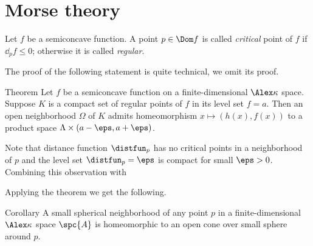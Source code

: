 \section{Morse theory}

Let $f$ be a semiconcave function.
A point $p\in \Dom f$ is called \emph{critical} point of $f$ if $\dd_pf\le 0$; 
otherwise it is called \emph{regular}.

The proof of the following statement is quite technical, we omit its proof.

\begin{thm}{Theorem}
Let $f$ be a semiconcave function on a finite-dimensional $\Alex\kappa$ space.
Suppose $K$ is a compact set of regular points of $f$ in its level set $f=a$.
Then an open neighborhood $\Omega$ of $K$ admits homeomorphism $x\mapsto (h(x),f(x))$ to a product space $\Lambda\times (a-\eps,a+\eps)$.

\end{thm}

Note that distance function $\distfun_p$ has no critical points in a neighborhood of $p$ and the level set $\distfun_p=\eps$ is compact for small $\eps>0$.
Combining this observation with 

Applying the theorem we get the following.

\begin{thm}{Corollary}
A small spherical neighborhood of any point $p$ in a finite-dimensional $\Alex\kappa$ space $\spc{A}$ is homeomorphic to an open cone over small sphere around $p$.
\end{thm}
